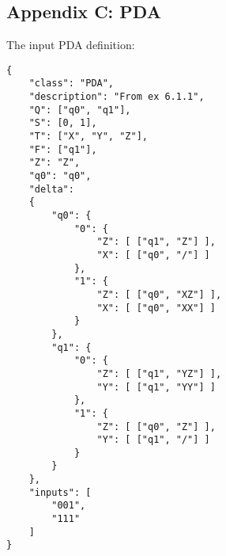 \documentclass[12pt]{article}  %
\begin{document}
\subsection{Appendix C: PDA}

The input PDA definition:
\begin{verbatim}
{
    "class": "PDA",
    "description": "From ex 6.1.1",
    "Q": ["q0", "q1"],
    "S": [0, 1],
    "T": ["X", "Y", "Z"],
    "F": ["q1"],
    "Z": "Z",
    "q0": "q0",
    "delta":
    {
        "q0": {
            "0": {
                "Z": [ ["q1", "Z"] ],
                "X": [ ["q0", "/"] ]
            },
            "1": {
                "Z": [ ["q0", "XZ"] ],
                "X": [ ["q0", "XX"] ]
            }
        },
        "q1": {
            "0": {
                "Z": [ ["q1", "YZ"] ],
                "Y": [ ["q1", "YY"] ]
            },
            "1": {
                "Z": [ ["q0", "Z"] ],
                "Y": [ ["q1", "/"] ]
            }
        }
    },
    "inputs": [
        "001",
        "111"
    ]
}
\end{verbatim}
\end{document}
